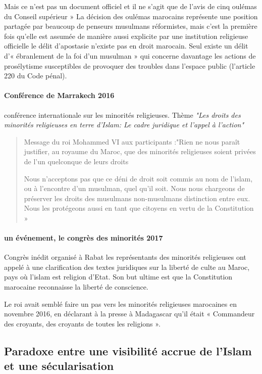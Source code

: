  Mais ce n'est pas un document officiel et il ne s'agit que de l'avis de cinq oulémas du Conseil supérieur » La décision des oulémas marocains représente une position partagée par beaucoup de penseurs musulmans réformistes, mais c'est la première fois qu'elle est assumée de manière aussi explicite par une institution religieuse officielle
  le délit d'apostasie n'existe pas en droit marocain.
Seul existe un délit d'« ébranlement de la foi d'un musulman » qui concerne davantage les actions de prosélytisme susceptibles de provoquer des troubles dans l'espace public (l'article 220 du Code pénal).
\paragraph{Conférence de Marrakech
2016}
conférence internationale sur les minorités religieuses.
Thème \textit{"Les droits des minorités
religieuses en terre d'Islam: Le cadre juridique et l'appel à l'action"}
\begin{quote}
    Message du roi Mohammed
VI aux participants
:"Rien ne nous paraît justifier, au royaume du Maroc, que des minorités religieuses soient privées de l'un quelconque de leurs droits 

Nous n'acceptons pas que ce déni de droit soit commis au nom de l'islam, ou à l'encontre d'un musulman, quel qu'il soit.
Nous nous chargeons de préserver les droits des musulmans non-musulmans distinction entre eux. Nous les protégeons aussi en tant que citoyens en vertu de la Constitution »
\end{quote}
 

\paragraph{un événement, le congrès des minorités
2017}  Congrès inédit organisé à Rabat les représentants des minorités religieuses ont appelé à une clarification des textes juridiques sur la liberté de culte au Maroc, pays où l'islam est religion d'Etat.
Son but ultime est que la Constitution marocaine reconnaisse la liberté de conscience.

Le roi avait semblé faire un pas vers les minorités religieuses marocaines en novembre 2016, en déclarant à la presse à Madagascar qu'il était « Commandeur des croyants, des croyants de toutes les religions ». 

\subsection{Paradoxe entre une visibilité accrue de l'Islam et une sécularisation}
